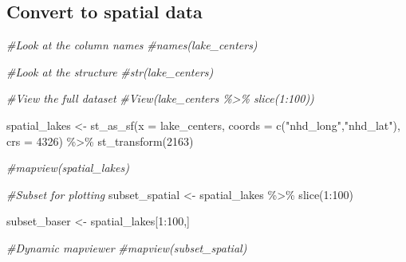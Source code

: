 \documentclass[
]{book}
\newenvironment{Shaded}{\begin{snugshade}}{\end{snugshade}}
\newcommand{\AttributeTok}[1]{\textcolor[rgb]{0.77,0.63,0.00}{#1}}
\newcommand{\CommentTok}[1]{\textcolor[rgb]{0.56,0.35,0.01}{\textit{#1}}}
\newcommand{\DecValTok}[1]{\textcolor[rgb]{0.00,0.00,0.81}{#1}}
\newcommand{\FunctionTok}[1]{\textcolor[rgb]{0.00,0.00,0.00}{#1}}
\newcommand{\NormalTok}[1]{#1}
\newcommand{\OtherTok}[1]{\textcolor[rgb]{0.56,0.35,0.01}{#1}}
\newcommand{\SpecialCharTok}[1]{\textcolor[rgb]{0.00,0.00,0.00}{#1}}
\newcommand{\StringTok}[1]{\textcolor[rgb]{0.31,0.60,0.02}{#1}}
\begin{document}
\begin{Shaded}
\end{Shaded}

\hypertarget{convert-to-spatial-data}{%
\subsection{Convert to spatial data}\label{convert-to-spatial-data}}

\begin{Shaded}
\begin{Highlighting}[]
\CommentTok{\#Look at the column names}
\CommentTok{\#names(lake\_centers)}

\CommentTok{\#Look at the structure}
\CommentTok{\#str(lake\_centers)}

\CommentTok{\#View the full dataset}
\CommentTok{\#View(lake\_centers \%\textgreater{}\% slice(1:100))}

\NormalTok{spatial\_lakes }\OtherTok{\textless{}{-}} \FunctionTok{st\_as\_sf}\NormalTok{(}\AttributeTok{x =}\NormalTok{ lake\_centers, }\AttributeTok{coords =} \FunctionTok{c}\NormalTok{(}\StringTok{"nhd\_long"}\NormalTok{,}\StringTok{"nhd\_lat"}\NormalTok{), }\AttributeTok{crs =} \DecValTok{4326}\NormalTok{) }\SpecialCharTok{\%\textgreater{}\%}
  \FunctionTok{st\_transform}\NormalTok{(}\DecValTok{2163}\NormalTok{)}

\CommentTok{\#mapview(spatial\_lakes)}

\CommentTok{\#Subset for plotting}
\NormalTok{subset\_spatial }\OtherTok{\textless{}{-}}\NormalTok{ spatial\_lakes }\SpecialCharTok{\%\textgreater{}\%}
  \FunctionTok{slice}\NormalTok{(}\DecValTok{1}\SpecialCharTok{:}\DecValTok{100}\NormalTok{) }

\NormalTok{subset\_baser }\OtherTok{\textless{}{-}}\NormalTok{ spatial\_lakes[}\DecValTok{1}\SpecialCharTok{:}\DecValTok{100}\NormalTok{,]}

\CommentTok{\#Dynamic mapviewer}
\CommentTok{\#mapview(subset\_spatial)}
\end{Highlighting}
\end{Shaded}
\end{document}
